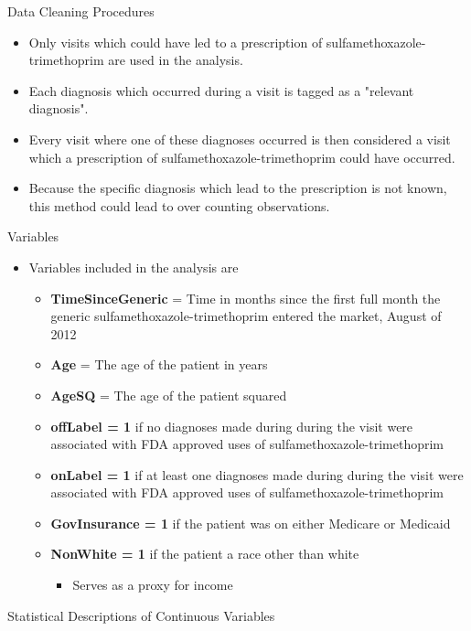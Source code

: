 \documentclass{beamer}
\begin{document}
\begin{frame}{Data Cleaning Procedures}
\begin{itemize}
\item Only visits which could have led to a prescription of sulfamethoxazole-trimethoprim are used in the analysis.
\item Each diagnosis which occurred during a visit is tagged as a "relevant diagnosis".
\item Every visit where one of these diagnoses occurred is then considered a visit which a prescription of sulfamethoxazole-trimethoprim could have occurred.
\item Because the specific diagnosis which lead to the prescription is not known, this method could lead to over counting observations.
\end{itemize}
\end{frame}

\begin{frame}{Variables}
\begin{itemize}
\item Variables included in the analysis are
\begin{itemize}
  \item \textbf{TimeSinceGeneric} = Time in months since the first full month the generic sulfamethoxazole-trimethoprim entered the market, August of 2012
  \item \textbf{Age} = The age of the patient in years
  \item \textbf{AgeSQ} = The age of the patient squared
  \item \textbf{offLabel = 1} if no diagnoses made during during the visit were associated with FDA approved uses of sulfamethoxazole-trimethoprim
  \item \textbf{onLabel = 1} if at least one diagnoses made during during the visit were associated with FDA approved uses of sulfamethoxazole-trimethoprim  
  \item \textbf{GovInsurance = 1} if the patient was on either Medicare or Medicaid
  \item \textbf{NonWhite = 1} if the patient a race other than white
  \begin{itemize}
  \item Serves as a proxy for income
  \end{itemize}
\end{itemize}
\end{itemize}
\end{frame}

\begin{frame}{Statistical Descriptions of Continuous Variables}
\scalebox{.475}{}
\end{frame}
\end{document}
